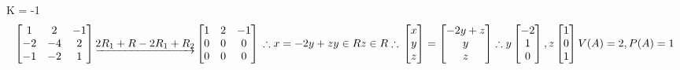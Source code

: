 \documentclass[
  11,
]{article}
\begin{document}
K = -1 \[
   \begin{bmatrix}1&2&-1\\-2&-4&2\\-1&-2&1\end{bmatrix} \underrightarrow{2R_1 + R-2 \\ R_1 + R_2} \begin{bmatrix}1&2&-1\\0&0&0\\0&0&0\end{bmatrix} \\ \therefore \\ x = -2y + z \\ y \in R \\ z \in R\\ \therefore \\ \begin{bmatrix}x\\y\\z\end{bmatrix} = \begin{bmatrix}-2y+z\\y\\z\end{bmatrix} \therefore y\begin{bmatrix}-2\\1\\0\end{bmatrix}, z\begin{bmatrix}1\\0\\1\end{bmatrix}\\V(A)= 2, P(A) = 1
   \]
\end{document}
